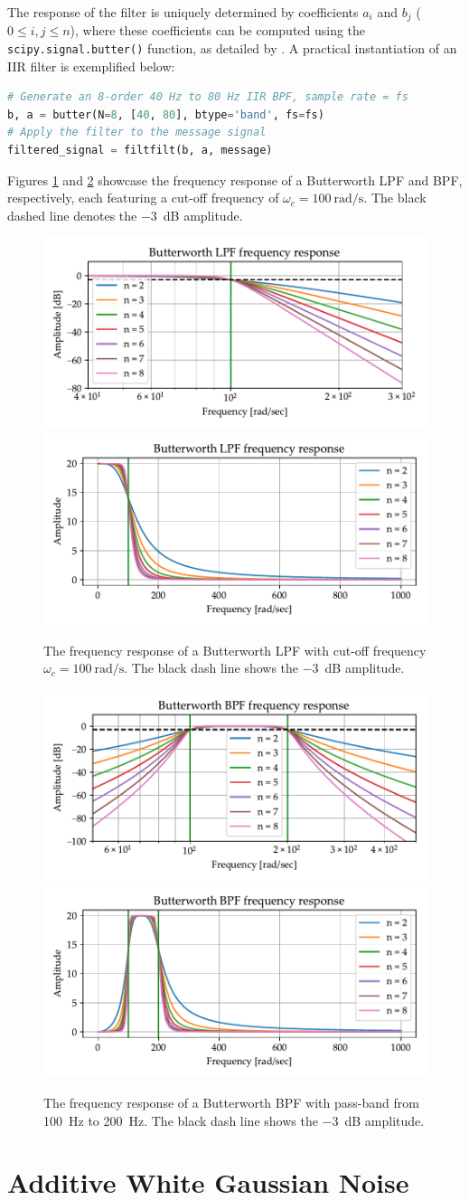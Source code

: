 \documentclass[../ECE459FinalProjectReport.tex]{subfiles}
\begin{document}
The response of the filter is uniquely determined by coefficients $a_i$ and $b_j$ ($0 \leq i, j \leq n$), where these coefficients can be computed using the \verb|scipy.signal.butter()| function, as detailed by \cite{thescipycommunityScipySignalButter, thescipycommunityScipySignalFiltfilt, thescipycommunityScipySignalLfilter}. A practical instantiation of an IIR filter is exemplified below:
\begin{lstlisting}[language=python]
# Generate an 8-order 40 Hz to 80 Hz IIR BPF, sample rate = fs
b, a = butter(N=8, [40, 80], btype='band', fs=fs)
# Apply the filter to the message signal
filtered_signal = filtfilt(b, a, message)
\end{lstlisting}

Figures \ref{fig:butter-lpf} and \ref{fig:butter-bpf} showcase the frequency response of a Butterworth LPF and BPF, respectively, each featuring a cut-off frequency of $\omega_c = \SI{100}{\radian\per\s}$. The black dashed line denotes the \SI{-3}{\dB} amplitude.

\begin{figure}[htb]
    \centering
    \includegraphics[width=0.45\linewidth]{plots/butterworth-lpf.pdf}
    \includegraphics[width=0.45\linewidth]{plots/butterworth-lpf-nolog.pdf}
    \caption{The frequency response of a Butterworth LPF with cut-off frequency $\omega_c = \SI{100}{\radian\per\s}$. The black dash line shows the \SI{-3}{\dB} amplitude.}
    \label{fig:butter-lpf}
\end{figure}
\begin{figure}[htb]
    \centering
    \includegraphics[width=0.45\linewidth]{plots/butterworth-bpf.pdf}
    \includegraphics[width=0.45\linewidth]{plots/butterworth-bpf-nolog.pdf}
    \caption{The frequency response of a Butterworth BPF with pass-band from \SI{100}{Hz} to \SI{200}{Hz}. The black dash line shows the \SI{-3}{\dB} amplitude.}
    \label{fig:butter-bpf}
\end{figure}


\section{Additive White Gaussian Noise}
\end{document}
